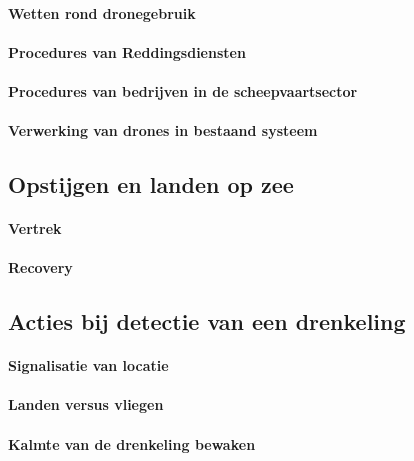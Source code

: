 \paragraph{Wetten rond dronegebruik}

\lipsum[1-2]

\paragraph{Procedures van Reddingsdiensten}

\lipsum[1-2]

\paragraph{Procedures van bedrijven in de scheepvaartsector}

\lipsum[1-2]

\paragraph{Verwerking van drones in bestaand systeem}

\lipsum[1-2]

\subsection{Opstijgen en landen op zee}

\paragraph{Vertrek}

\lipsum[1-2]

\paragraph{Recovery}

\lipsum[1-2]

\subsection{Acties bij detectie van een drenkeling}

\paragraph{Signalisatie van locatie}

\lipsum[1-2]

\paragraph{Landen versus vliegen}

\lipsum[1-2]

\paragraph{Kalmte van de drenkeling bewaken}

\lipsum[1-2]
